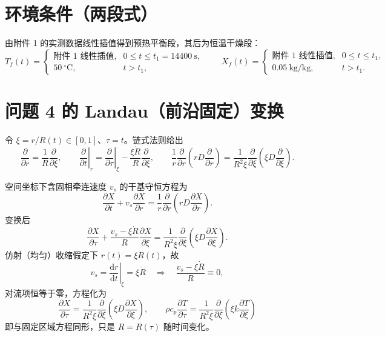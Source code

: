 \documentclass[11pt]{ctexart}
\newcommand{\dd}{\mathrm{d}}
\newcommand{\pd}[2]{\frac{\partial #1}{\partial #2}}
\begin{document}
\section{环境条件（两段式）}
由附件 1 的实测数据线性插值得到预热平衡段，其后为恒温干燥段：
\begin{equation}
T_f(t)=
\begin{cases}
\text{附件 1 线性插值}, & 0\le t\le t_1=14400\ \mathrm s,\\[2pt]
50\ ^\circ\mathrm C, & t>t_1,
\end{cases}
\qquad
X_f(t)=
\begin{cases}
\text{附件 1 线性插值}, & 0\le t\le t_1,\\[2pt]
0.05\ \mathrm{kg/kg}, & t>t_1 .
\end{cases}
\end{equation}

\section{问题 4 的 Landau（前沿固定）变换}

令 $\xi=r/R(t)\in[0,1]$、$\tau=t$。链式法则给出
\begin{equation}
\pd{}{r}=\frac1R\pd{}{\xi},
\qquad
\left.\pd{}{t}\right|_r=\left.\pd{}{\tau}\right|_{\xi}-\frac{\xi \dot R}{R}\pd{}{\xi},
\qquad
\frac1r\pd{}{r}\!\left(rD\pd{}{r}\right)
=\frac{1}{R^2\xi}\pd{}{\xi}\!\left(\xi D\pd{}{\xi}\right).
\end{equation}

空间坐标下含固相牵连速度 $v_s$ 的干基守恒方程为
\begin{equation}
\pd{X}{t}+v_s\pd{X}{r}
=\frac1r\pd{}{r}\!\left(rD\pd{X}{r}\right).
\end{equation}
变换后
\begin{equation}
\pd{X}{\tau}+\frac{v_s-\xi\dot R}{R}\pd{X}{\xi}
=\frac{1}{R^2\xi}\pd{}{\xi}\!\left(\xi D\pd{X}{\xi}\right).
\end{equation}
仿射（均匀）收缩假定下 $r(t)=\xi R(t)$，故
\begin{equation}
v_s=\left.\frac{\dd r}{\dd t}\right|_{\xi}=\xi\dot R
\quad\Longrightarrow\quad
\frac{v_s-\xi\dot R}{R}\equiv 0 ,
\end{equation}
对流项恒等于零，方程化为
\begin{equation}
\boxed{\;
\pd{X}{\tau}=\frac{1}{R^2\xi}\pd{}{\xi}\!\left(\xi D\pd{X}{\xi}\right),
\qquad
\rho c_p\pd{T}{\tau}=\frac{1}{R^2\xi}\pd{}{\xi}\!\left(\xi k\pd{T}{\xi}\right)
\;}
\end{equation}
即与固定区域方程同形，只是 $R=R(\tau)$ 随时间变化。
\end{document}
